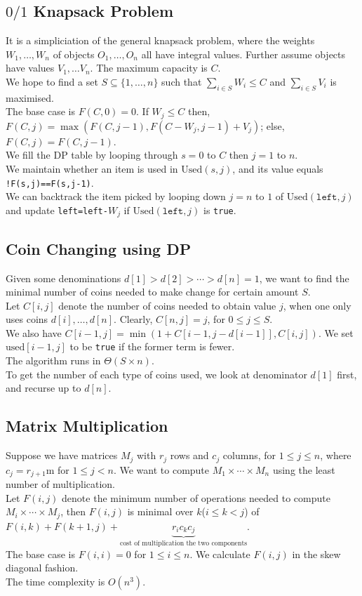 \documentclass[12pt]{article}
\theoremstyle{definition}
\newcommand{\T}{\Theta}
\begin{document}
\subsection{$0/1$ Knapsack Problem}
It is a simpliciation of the general knapsack problem, where the weights $W_1,\ldots, W_n$ of objects $O_1,\ldots, O_n$ all have integral values. Further assume objects have values $V_1,\ldots V_n$. The maximum capacity is $C$.\\
We hope to find a set $S\subseteq\{1,\ldots, n\}$ such that $\sum_{i\in S}W_i\leq C$ and $\sum_{i\in S}V_i$ is maximised.\\
The base case is $F(C,0)=0$. If $W_j\leq C$ then, $F(C,j)=\max(F(C,j-1),F(C-W_j,j-1)+V_j)$; else, $F(C,j)=F(C,j-1)$.\\
We fill the DP table by looping through $s=0$ to $C$ then $j=1$ to $n$.\\
We maintain whether an item is used in $\text{Used}(s,j)$, and its value equals \texttt{!F(s,j)==F(s,j-1)}.\\
We can backtrack the item picked by looping down $j=n$ to $1$ of $\text{Used}(\texttt{left}, j)$ and update \texttt{left=left-$W_j$} if $\text{Used}(\texttt{left}, j)$ is \texttt{true}.
\subsection{Coin Changing using DP}
Given some denominations $d[1]>d[2]>\cdots>d[n]=1$, we want to find the minimal number of coins needed to make change for certain amount $S$.\\
Let $C[i,j]$ denote the number of coins needed to obtain value $j$, when one only uses coins $d[i],\ldots, d[n]$. Clearly, $C[n,j]=j$, for $0\leq j\leq S$.\\
We also have $C[i-1,j] = \min(1+C[i-1,j-d[i-1]], C[i,j])$. We set $\text{used}[i-1,j]$ to be \texttt{true} if the former term is fewer.\\
The algorithm runs in $\T(S\times n)$.\\
To get the number of each type of coins used, we look at denominator $d[1]$ first, and recurse up to $d[n]$.
\subsection{Matrix Multiplication}
Suppose we have matrices $M_j$ with $r_j$ rows and $c_j$ columns, for $1\leq j\leq n$, where $c_j=r_{j+1}$m for $1\leq j<n$. We want to compute $M_1\times \cdots \times M_n$ using the least number of multiplication.\\
Let $F(i,j)$ denote the minimum number of operations needed to compute $M_i\times \cdots\times M_j$, then $F(i,j)$ is minimal over $k$($i\leq k<j$) of $F(i,k)+F(k+1,j)+\underbrace{r_ic_kc_j}_{\text{cost of multiplication the two components}}$.\\
The base case is $F(i,i)=0$ for $1\leq i\leq n$. We calculate $F(i,j)$ in the skew diagonal fashion.\\
The time complexity is $O(n^3)$.
\end{document}

